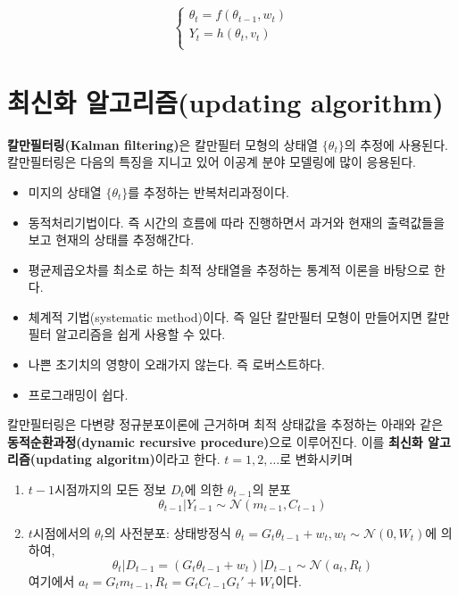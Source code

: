 \documentclass[b5paper,]{scrbook}
\theoremstyle{plain}
\theoremstyle{definition}
\numberwithin{equation}{section}
\begin{document}
\[
\begin{cases}
\theta_{t}=f(\theta_{t-1},w_{t}) \\
Y_{t}=h(\theta_{t},v_{t})\\
\end{cases}
\]

\section{최신화 알고리즘(updating algorithm)}\label{-updating-algorithm}

\textbf{칼만필터링(Kalman filtering)}은 칼만필터 모형의 상태열
\(\{ \theta_{t}\}\)의 추정에 사용된다. 칼만필터링은 다음의 특징을 지니고
있어 이공계 분야 모델링에 많이 응용된다.

\begin{itemize}
\item
  미지의 상태열 \(\{\theta_{t}\}\)를 추정하는 반복처리과정이다.
\item
  동적처리기법이다. 즉 시간의 흐름에 따라 진행하면서 과거와 현재의
  출력값들을 보고 현재의 상태를 추정해간다.
\item
  평균제곱오차를 최소로 하는 최적 상태열을 추정하는 통계적 이론을
  바탕으로 한다.
\item
  체계적 기법(systematic method)이다. 즉 일단 칼만필터 모형이 만들어지면
  칼만필터 알고리즘을 쉽게 사용할 수 있다.
\item
  나쁜 초기치의 영향이 오래가지 않는다. 즉 로버스트하다.
\item
  프로그래밍이 쉽다.
\end{itemize}

칼만필터링은 다변량 정규분포이론에 근거하며 최적 상태값을 추정하는
아래와 같은 \textbf{동적순환과정(dynamic recursive procedure)}으로
이루어진다. 이를 \textbf{최신화 알고리즘(updating algoritm)}이라고 한다.
\(t=1,2,\ldots\)로 변화시키며

\begin{enumerate}
\def\labelenumi{\arabic{enumi}.}
\item
  \(t-1\)시점까지의 모든 정보 \(D_{t}\)에 의한 \(\theta_{t-1}\)의 분포
  \[\theta_{t-1}|Y_{t-1} \sim \mathcal{N}(m_{t-1},C_{t-1})\]
\item
  \(t\)시점에서의 \(\theta_{t}\)의 사전분포: 상태방정식
  \(\theta_{t}=G_{t}\theta_{t-1}+w_{t}, w_{t} \sim \mathcal{N}(0,W_{t})\)에
  의하여,
  \[\theta_{t}|D_{t-1} = (G_{t}\theta_{t-1}+w_{t})|D_{t-1}\sim \mathcal{N}(a_{t},R_{t})\]
  여기에서 \(a_{t}=G_{t}m_{t-1}, R_{t}=G_{t}C_{t-1}G_{t}'+W_{t}\)이다.
\end{enumerate}
\end{document}
